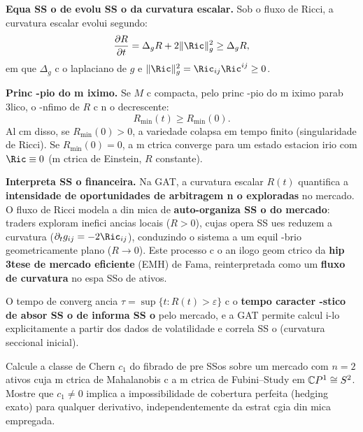 \begin{sol}
\textbf{Equa SS o de evolu SS o da curvatura escalar.} Sob o fluxo de Ricci, a curvatura escalar evolui segundo:
\begin{equation}
 \frac{\partial R}{\partial t} = \Delta_g R + 2\|\Ric\|^2_g \geq \Delta_g R,
\end{equation}
em que $\Delta_g$ c o laplaciano de $g$ e $\|\Ric\|^2_g = \Ric_{ij}\Ric^{ij}\geq 0$.

\textbf{Princ -pio do m iximo.} Se $M$ c compacta, pelo princ -pio do m iximo parab 3lico, o -nfimo de $R$ c n o decrescente:
\begin{equation}
 R_{\min}(t) \geq R_{\min}(0).
\end{equation}
Al cm disso, se $R_{\min}(0)>0$, a variedade colapsa em tempo finito (singularidade de Ricci). Se $R_{\min}(0)=0$, a m ctrica converge para um estado estacion irio com $\Ric\equiv 0$ (m ctrica de Einstein, $R$ constante).

\textbf{Interpreta SS o financeira.} Na GAT, a curvatura escalar $R(t)$ quantifica a \textbf{intensidade de oportunidades de arbitragem n o exploradas} no mercado. O fluxo de Ricci modela a din mica de \textbf{auto-organiza SS o do mercado}: traders exploram inefici ancias locais ($R>0$), cujas opera SS ues reduzem a curvatura ($\partial_t g_{ij} = -2\Ric_{ij}$), conduzindo o sistema a um equil -brio geometricamente plano ($R\to 0$). Este processo c o an ilogo geom ctrico da \textbf{hip 3tese de mercado eficiente} (EMH) de Fama, reinterpretada como um \textbf{fluxo de curvatura} no espa SSo de ativos.

O tempo de converg ancia $\tau = \sup\{t: R(t)>\varepsilon\}$ c o \textbf{tempo caracter -stico de absor SS o de informa SS o} pelo mercado, e a GAT permite calcul i-lo explicitamente a partir dos dados de volatilidade e correla SS o (curvatura seccional inicial).
\end{sol}

\begin{exer}
\label{ex:topologia}
Calcule a classe de Chern $c_1$ do fibrado de pre SSos sobre um mercado com $n=2$ ativos cuja m ctrica de Mahalanobis c a m ctrica de Fubini--Study em $\mathbb{C} P^1\cong S^2$. Mostre que $c_1 \neq 0$ implica a impossibilidade de cobertura perfeita (hedging exato) para qualquer derivativo, independentemente da estrat cgia din mica empregada.
\end{exer}

